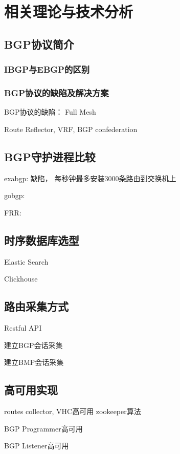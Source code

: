 
\chapter{相关理论与技术分析}

\section{BGP协议简介}

\subsection{IBGP与EBGP的区别}


\subsection{BGP协议的缺陷及解决方案}
BGP协议的缺陷： Full Mesh

Route Reflector, VRF, BGP confederation

\section{BGP守护进程比较}
exabgp: 缺陷， 每秒钟最多安装3000条路由到交换机上

gobgp:

FRR:

\section{时序数据库选型}
Elastic Search

Clickhouse

\section{路由采集方式}
Restful API

建立BGP会话采集

建立BMP会话采集

\section{高可用实现}
routes collector, VHC高可用 zookeeper算法

BGP Programmer高可用

BGP Listener高可用